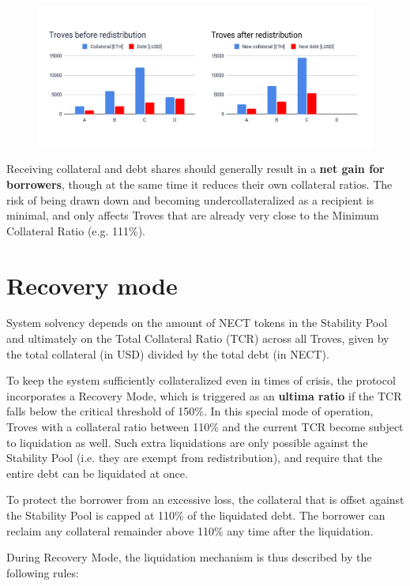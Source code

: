 \documentclass{article}
\begin{document}
\begin{figure}[H]
\centering
\includegraphics[width=16cm]{a12.png}
\end{figure} 

Receiving collateral and debt shares should generally result in a \textbf{net gain for borrowers}, though at the same time it reduces their own collateral ratios. The risk of being drawn down and becoming undercollateralized as a recipient is minimal, and only affects Troves that are already very close to the Minimum Collateral Ratio (e.g. 111\%).

\section{Recovery mode}
System solvency depends on the amount of NECT tokens in the Stability Pool and ultimately on the Total Collateral Ratio (TCR) across all Troves, given by the total collateral (in USD) divided by the total debt (in NECT). 

To keep the system sufficiently collateralized even in times of crisis, the protocol incorporates a Recovery Mode, which is triggered as an \textbf{ultima ratio} if the TCR falls below the critical threshold of 150\%. In this special mode of operation, Troves with a collateral ratio between 110\% and the current TCR become subject to liquidation as well. Such extra liquidations are only possible against the Stability Pool (i.e. they are exempt from redistribution), and require that the entire debt can be liquidated at once. 

To protect the borrower from an excessive loss, the collateral that is offset against the Stability Pool is capped at 110\% of the liquidated debt. The borrower can reclaim any collateral remainder above 110\% any time after the liquidation.

During Recovery Mode, the liquidation mechanism is thus described by the following rules:\\
\end{document}
